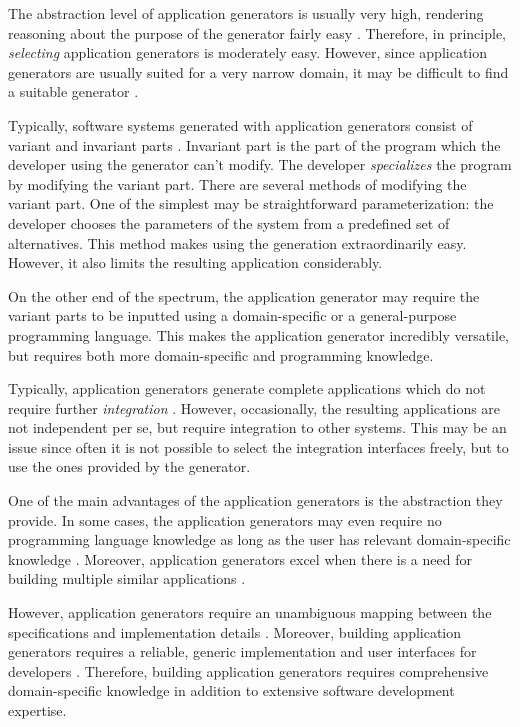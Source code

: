 The abstraction level of application generators is usually very high, rendering reasoning about the purpose of the generator fairly easy \citep[chap.~7]{krueger_software_1992}. Therefore, in principle, \emph{selecting} application generators is moderately easy. However, since application generators are usually suited for a very narrow domain, it may be difficult to find a suitable generator \citep[chap.~7]{krueger_software_1992}.

Typically, software systems generated with application generators consist of variant and invariant parts \citep[chap.~7]{krueger_software_1992}. Invariant part is the part of the program which the developer using the generator can't modify. The developer \emph{specializes} the program by modifying the variant part. There are several methods of modifying the variant part. One of the simplest may be straightforward parameterization: the developer chooses the parameters of the system from a predefined set of alternatives. This method makes using the generation extraordinarily easy. However, it also limits the resulting application considerably.

On the other end of the spectrum, the application generator may require the variant parts to be inputted using a domain-specific or a general-purpose programming language. This makes the application generator incredibly versatile, but requires both more domain-specific and programming knowledge.

Typically, application generators generate complete applications which do not require further \emph{integration} \citep[chap.~7]{krueger_software_1992}. However, occasionally, the resulting applications are not independent per se, but require integration to other systems. This may be an issue since often it is not possible to select the integration interfaces freely, but to use the ones provided by the generator.

One of the main advantages of the application generators is the abstraction they provide. In some cases, the application generators may even require no programming language knowledge as long as the user has relevant domain-specific knowledge \citep{horowitz_survey_1985}. Moreover, application generators excel when there is a need for building multiple similar applications \citep[chap.~7]{krueger_software_1992}. 

However, application generators require an unambiguous mapping between the specifications and implementation details \citep[chap.~7]{krueger_software_1992}. Moreover, building application generators requires a reliable, generic implementation and user interfaces for developers \citep{cleaveland_building_1988}. Therefore, building application generators requires comprehensive domain-specific knowledge in addition to extensive software development expertise.

